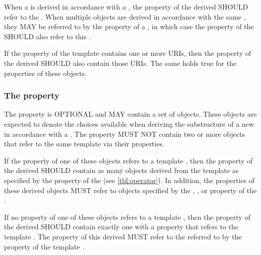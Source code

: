 When a  is derived in accordance with a , the  property of the derived  SHOULD refer to the . When multiple  objects are derived in accordance with the same , they MAY be referred to by the  property of a , in which case the  property of the  SHOULD also refer to this .

If the  property of the template  contains one or more URIs, then the  property of the derived  SHOULD also contain those URIs. The same holds true for the  properties of these  objects.

\subsubsection*{ The  property}\label{sec:variableComponents}

The  property is OPTIONAL and MAY contain a set of  objects. These  objects are expected to denote the choices available when deriving the substructure of a new  in accordance with a . The  property MUST NOT contain two or more  objects that refer to the same template  via their  properties.

If the  property of one of these  objects refers to a template , then the  property of the derived  SHOULD contain as many  objects derived from the template  as specified by the  property of the  (see \ref{tbl:operator}). In addition, the  properties of these derived  objects MUST refer to  objects specified by the , , or  property of the .

If no  property of one of these  objects refers to a template , then the  property of the derived  SHOULD contain exactly one  with a  property that refers to the template . The  property of this derived  MUST refer to the  referred to by the  property of the template .

